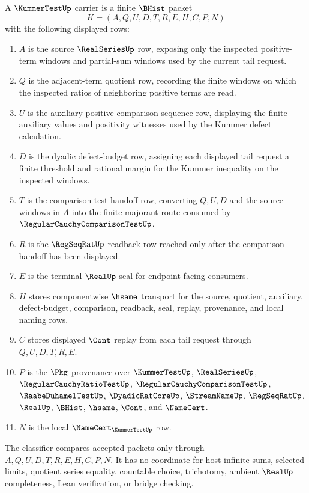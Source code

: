\begin{definition}\label{def:kummer-test-carrier}
A $\KummerTestUp$ carrier is a finite $\BHist$ packet
$$
K=(A,Q,U,D,T,R,E,H,C,P,N)
$$
with the following displayed rows:
\begin{enumerate}
\item $A$ is the source $\RealSeriesUp$ row, exposing only the inspected positive-term windows and partial-sum windows used by the current tail request.
\item $Q$ is the adjacent-term quotient row, recording the finite windows on which the inspected ratios of neighboring positive terms are read.
\item $U$ is the auxiliary positive comparison sequence row, displaying the finite auxiliary values and positivity witnesses used by the Kummer defect calculation.
\item $D$ is the dyadic defect-budget row, assigning each displayed tail request a finite threshold and rational margin for the Kummer inequality on the inspected windows.
\item $T$ is the comparison-test handoff row, converting $Q,U,D$ and the source windows in $A$ into the finite majorant route consumed by $\RegularCauchyComparisonTestUp$.
\item $R$ is the $\RegSeqRatUp$ readback row reached only after the comparison handoff has been displayed.
\item $E$ is the terminal $\RealUp$ seal for endpoint-facing consumers.
\item $H$ stores componentwise $\hsame$ transport for the source, quotient, auxiliary, defect-budget, comparison, readback, seal, replay, provenance, and local naming rows.
\item $C$ stores displayed $\Cont$ replay from each tail request through $Q,U,D,T,R,E$.
\item $P$ is the $\Pkg$ provenance over $\KummerTestUp$, $\RealSeriesUp$, $\RegularCauchyRatioTestUp$, $\RegularCauchyComparisonTestUp$, $\RaabeDuhamelTestUp$, $\DyadicRatCoreUp$, $\StreamNameUp$, $\RegSeqRatUp$, $\RealUp$, $\BHist$, $\hsame$, $\Cont$, and $\NameCert$.
\item $N$ is the local $\NameCert_{\KummerTestUp}$ row.
\end{enumerate}
The classifier compares accepted packets only through $A,Q,U,D,T,R,E,H,C,P,N$. It has no coordinate for host infinite sums, selected limits, quotient series equality, countable choice, trichotomy, ambient $\RealUp$ completeness, Lean verification, or bridge checking.
\end{definition}

